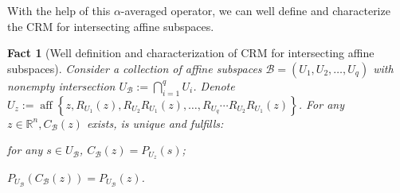 \documentclass[smallextended,numbook,nospthms]{svjour3}
\theoremstyle{plain}
\newtheorem{fact}[theorem]{Fact}
\theoremstyle{definition}
\def\RR{\mathds R}
\begin{document}
With the help of this $\alpha$-averaged operator, we can well define and characterize the CRM for intersecting affine subspaces.

\begin{fact}[Well definition and characterization of CRM for intersecting affine subspaces]\label{fact:CRM well def char} Consider a collection of affine subspaces $\mathcal{B}=\left(U_{1}, U_{2}, \ldots, U_{q}\right)$ with nonempty intersection $U_{\mathcal{B}}:=\bigcap_{i=1}^{q} U_{i}$. Denote $U_{z}:=\operatorname{aff}\left\{z, R_{U_{1}}(z), R_{U_{2}} R_{U_{1}}(z), \ldots, R_{U_{q}} \cdots R_{U_{2}} R_{U_{1}}(z)\right\}$. For any $z \in \RR^{n}, C_{\mathcal{B}}(z)$ exists, is unique and fulfills:
	\begin{listi}
		\item for any $s \in U_{\mathcal{B}}$, $C_{\mathcal{B}}(z)=P_{U_{z}}(s)$;
		\item $P_{U_{\mathcal{B}}}\left(C_{\mathcal{B}}(z)\right)=P_{U_{\mathcal{B}}}(z)$.
	\end{listi}
\end{fact}
\end{document}
